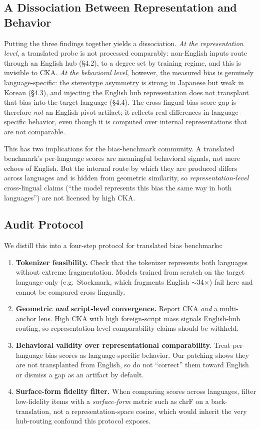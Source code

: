\documentclass[11pt]{article}
\begin{document}
\subsection{A Dissociation Between Representation and Behavior}

Putting the three findings together yields a dissociation. \emph{At the representation level}, a translated probe is not processed comparably: non-English inputs route through an English hub (\S4.2), to a degree set by training regime, and this is invisible to CKA. \emph{At the behavioral level}, however, the measured bias is genuinely language-specific: the stereotype asymmetry is strong in Japanese but weak in Korean (\S4.3), and injecting the English hub representation does not transplant that bias into the target language (\S4.4). The cross-lingual bias-score gap is therefore \emph{not} an English-pivot artifact; it reflects real differences in language-specific behavior, even though it is computed over internal representations that are not comparable.

This has two implications for the bias-benchmark community. A translated benchmark's per-language scores are meaningful behavioral signals, not mere echoes of English. But the internal route by which they are produced differs across languages and is hidden from geometric similarity, so \emph{representation-level} cross-lingual claims (``the model represents this bias the same way in both languages'') are not licensed by high CKA.

\subsection{Audit Protocol}\label{sec:protocol}

We distill this into a four-step protocol for translated bias benchmarks:

\begin{enumerate}
\item \textbf{Tokenizer feasibility.} Check that the tokenizer represents both languages without extreme fragmentation. Models trained from scratch on the target language only (e.g.\ Stockmark, which fragments English $\sim$34$\times$) fail here and cannot be compared cross-lingually.
\item \textbf{Geometric \emph{and} script-level convergence.} Report CKA \emph{and} a multi-anchor lens. High CKA with high foreign-script mass signals English-hub routing, so representation-level comparability claims should be withheld.
\item \textbf{Behavioral validity over representational comparability.} Treat per-language bias scores as language-specific behavior. Our patching shows they are not transplanted from English, so do not ``correct'' them toward English or dismiss a gap as an artifact by default.
\item \textbf{Surface-form fidelity filter.} When comparing scores across languages, filter low-fidelity items with a \emph{surface-form} metric such as chrF \citep{popovic2015chrf} on a back-translation, not a representation-space cosine, which would inherit the very hub-routing confound this protocol exposes.
\end{enumerate}
\end{document}
